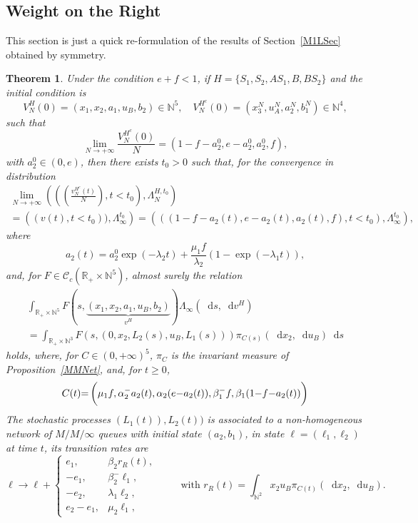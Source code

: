 \documentclass[english]{amsart}
\newcommand{\N}{\ensuremath{\mathbb{N}}}
\newcommand{\R}{\ensuremath{\mathbb{R}}}
\newcommand{\diff}{\mathop{}\mathopen{}\mathrm{d}}
\newcommand{\cal}[1]{\ensuremath{\mathcal{#1}}}
\newtheorem{theorem}[proposition]{Theorem}
\numberwithin{proposition}{section}
\begin{document}
\subsection{Weight on the Right}\label{M1RSec}
This section is just a quick re-formulation of the results of Section~\ref{M1LSec} obtained by symmetry. 
\begin{theorem}\label{ThM1R}
Under the condition $e{+}f{<}1$, if $H{=}\{  { S}_1, { S}_2,  { AS_1},{ B},  { BS_2}\}$ and the initial condition is 
\[
V_N^H(0)=(x_1,x_2,a_1,u_B,b_2)\in\N^5, \quad V_N^{H^c}(0)=(x_3^N,u_A^N,a_2^N,b_1^N)\in\N^4,
\]
such that
\[
\lim_{N\to+\infty}\frac{V_N^{H^c}(0)}{N}=(1{-}f{-}a_2^0,e{-}a_2^0,a_2^0,f),
\]
with $a_2^0{\in}(0,e)$, then there exists $t_0{>}0$ such that,  for the convergence in distribution
\begin{multline}\label{CVWR}
\lim_{N\to+\infty}\left(\left(\left(\frac{v_N^{H^c}(t)}{N}\right),t{<}t_0\right),\Lambda^{H,t_0}_N\right)\\ =\left((v(t),t{<}t_0)),\Lambda^{t_0}_{\infty}\right)=
\left(\left(\left(1{-}f{-}{a}_2(t),e{-}{a}_2(t),{a}_2(t),f\right),t{<}t_0\right),\Lambda^{t_0}_\infty\right),
\end{multline}
where 
\[
a_2(t)=a_2^0\exp(-\lambda_2t)+\frac{\mu_1 f}{\lambda_2}\left(1-\exp(-\lambda_1t)\right),
\]
 and, for $F{\in}{\cal C}_c(\R_+{\times}\N^5)$, almost surely the relation
\begin{multline*}
\int_{\R_+{\times}\N^5} F(s,\underbrace{(x_1,x_2,a_1,u_B,b_2)}_{v^H})\Lambda_{\infty}(\diff s, \diff v^H)\\ =\int_{\R_+{\times}\N^3} F(s,(0,x_2,L_2(s),u_B,L_1(s)))\pi_{C(s)}(\diff x_2,\diff u_B)\diff s
\end{multline*}
holds, where, for $C{\in}(0,{+}\infty)^5$,  $\pi_{C}$ is the invariant measure of Proposition~\ref{MMNet}, and, for $t{\ge}0$, 
\[
C(t){=}\left(\rule{0mm}{5mm}\mu_1f,\alpha_2^-{a}_2(t),\alpha_2(e{-}{a}_2(t)),\beta_1^-f,\beta_1(1{-}f{-}{a}_2(t))\right)
\]
The stochastic processes $(L_1(t)),L_2(t))$ is associated to a non-homogeneous network of $M/M/\infty$ queues with initial state $(a_2,b_1)$, in state $\ell{=}(\ell_1,\ell_2)$ at time $t$, its transition rates are 
  \[
    \ell{\longrightarrow}   \ell {+} \begin{cases}
\scriptstyle{e_{1}}, &\scriptstyle{\beta_2r_R(t)},\\
\scriptstyle{{-}e_{1}}, &\scriptstyle{\beta_2^-\ell_1},\\
\scriptstyle{{-}e_{2}}, &\scriptstyle{\lambda_1\ell_2},\\
\scriptstyle{e_{2}{-}e_{1}}, &\scriptstyle{\mu_2\ell_1},
   \end{cases}
\qquad   \text{ with }   r_R(t)=\int_{\N^2} x_2u_B\pi_{C(t)}(\diff x_2,\diff u_B).
\]

\end{theorem}
\end{document}
